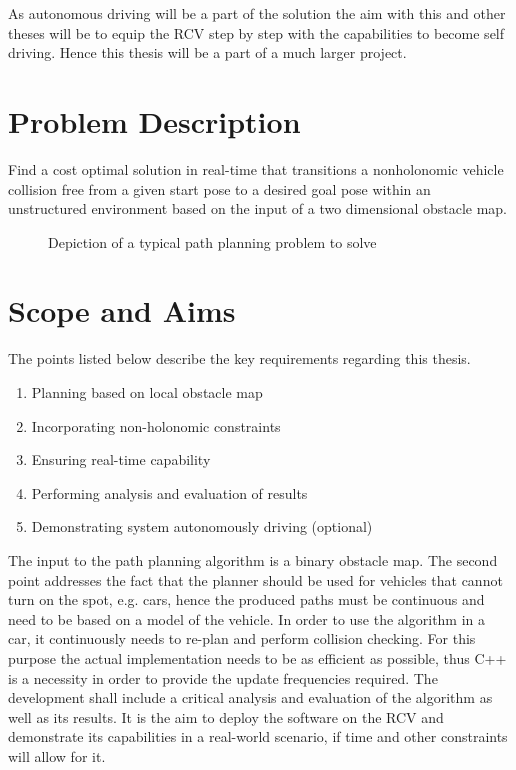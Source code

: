 As autonomous driving will be a part of the solution the aim with this and other theses will be to equip the RCV step by step with the capabilities to become self driving. Hence this thesis will be a part of a much larger project.

\section{Problem Description}
Find a cost optimal solution in real-time that transitions a nonholonomic vehicle collision free from a given start pose to a desired goal pose within an unstructured environment based on the input of a two dimensional obstacle map.

\begin{figure}[h]
\caption{Depiction of a typical path planning problem to solve}
\label{fig:ProblemDepiction}
\end{figure}


\section{Scope and Aims}
The points listed below describe the key requirements regarding this thesis.

\begin{enumerate}
    \item Planning based on local obstacle map
    \item Incorporating non-holonomic constraints
    \item Ensuring real-time capability
    \item Performing analysis and evaluation of results
    \item Demonstrating system autonomously driving (optional)
\end{enumerate}

The input to the path planning algorithm is a binary obstacle map. The second point addresses the fact that the planner should be used for vehicles that cannot turn on the spot, e.g. cars, hence the produced paths must be continuous and need to be based on a model of the vehicle. In order to use the algorithm in a car, it continuously needs to re-plan and perform collision checking. For this purpose the actual implementation needs to be as efficient as possible, thus C++ is a necessity in order to provide the update frequencies required. The development shall include a critical analysis and evaluation of the algorithm as well as its results. It is the aim to deploy the software on the RCV and demonstrate its capabilities in a real-world scenario, if time and other constraints will allow for it.

